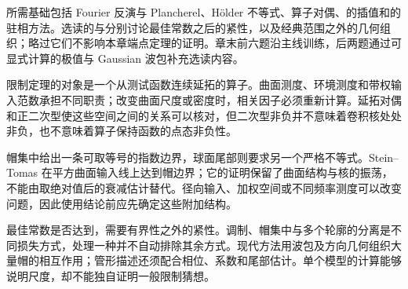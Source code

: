 \ProseParagraphBreak

所需基础包括 Fourier 反演与 Plancherel、Hölder 不等式、算子对偶、的插值和的驻相方法。选读的与分别讨论最佳常数之后的紧性，以及经典范围之外的几何组织；略过它们不影响本章端点定理的证明。章末前六题沿主线训练，后两题通过可显式计算的极值与 Gaussian 波包补充选读内容。








\begin{chaptersummary}
限制定理的对象是一个从测试函数连续延拓的算子。曲面测度、环境测度和带权输入范数承担不同职责；改变曲面尺度或密度时，相关因子必须重新计算。延拓对偶和正二次型使这些空间之间的关系可以核对，但二次型非负并不意味着卷积核处处非负，也不意味着算子保持函数的点态非负性。

\ProseParagraphBreak

帽集中给出一条可取等号的指数边界，球面尾部则要求另一个严格不等式。Stein--Tomas 在平方曲面输入线上达到帽边界；它的证明保留了曲面结构与核的振荡，不能由取绝对值后的衰减估计替代。径向输入、加权空间或不同频率测度可以改变问题，因此使用结论前应先确定这些附加结构。

\ProseParagraphBreak

最佳常数是否达到，需要有界性之外的紧性。调制、帽集中与多个轮廓的分离是不同损失方式，处理一种并不自动排除其余方式。现代方法用波包及方向几何组织大量帽的相互作用；管形描述还须配合相位、系数和尾部估计。单个模型的计算能够说明尺度，却不能独自证明一般限制猜想。
\end{chaptersummary}

\BookExercises

